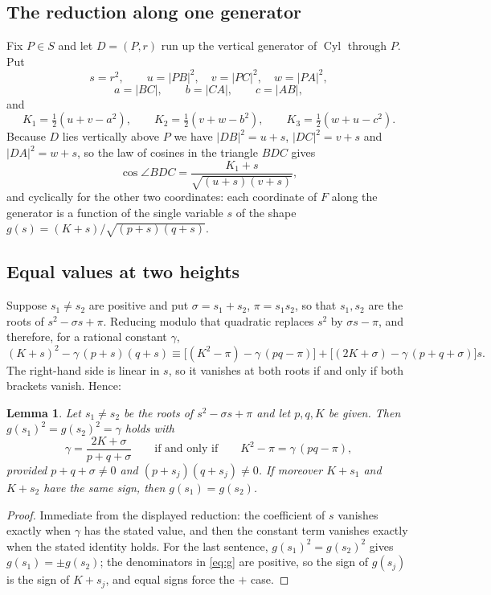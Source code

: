 \documentclass[11pt]{amsart}
\newtheorem{lemma}[theorem]{Lemma}
\theoremstyle{remark}
\DeclareMathOperator{\Cyl}{Cyl}
\begin{document}
\subsection*{The reduction along one generator}
Fix $P\in S$ and let $D=(P,r)$ run up the vertical generator of $\Cyl$ through $P$. Put
\[
 s=r^{2},\qquad u=|PB|^{2},\quad v=|PC|^{2},\quad w=|PA|^{2},
\]
\[
 a=|BC|,\qquad b=|CA|,\qquad c=|AB|,
\]
and
\[
 K_1=\tfrac12(u+v-a^{2}),\qquad K_2=\tfrac12(v+w-b^{2}),\qquad K_3=\tfrac12(w+u-c^{2}).
\]
Because $D$ lies vertically above $P$ we have $|DB|^{2}=u+s$, $|DC|^{2}=v+s$ and
$|DA|^{2}=w+s$, so the law of cosines in the triangle $BDC$ gives
\begin{equation}\label{eq:g}
 \cos\angle BDC=\frac{K_1+s}{\sqrt{(u+s)(v+s)}},
\end{equation}
and cyclically for the other two coordinates: each coordinate of $F$ along the generator is
a function of the single variable $s$ of the shape
$g(s)=(K+s)\bigl/\sqrt{(p+s)(q+s)}$.

\subsection*{Equal values at two heights}
Suppose $s_1\neq s_2$ are positive and put $\sigma=s_1+s_2$, $\pi=s_1s_2$, so that $s_1,s_2$
are the roots of $s^{2}-\sigma s+\pi$. Reducing modulo that quadratic replaces $s^{2}$ by
$\sigma s-\pi$, and therefore, for a rational constant $\gamma$,
\[
 (K+s)^{2}-\gamma\,(p+s)(q+s)
 \equiv
 \bigl[(K^{2}-\pi)-\gamma\,(pq-\pi)\bigr]
 +\bigl[(2K+\sigma)-\gamma\,(p+q+\sigma)\bigr]s .
\]
The right-hand side is linear in $s$, so it vanishes at both roots if and only if both
brackets vanish. Hence:

\begin{lemma}\label{lem:two}
Let $s_1\neq s_2$ be the roots of $s^{2}-\sigma s+\pi$ and let $p,q,K$ be given. Then
$g(s_1)^{2}=g(s_2)^{2}=\gamma$ holds with
\begin{equation}\label{eq:gamma}
 \gamma=\frac{2K+\sigma}{p+q+\sigma}
 \qquad\text{if and only if}\qquad
 K^{2}-\pi=\gamma\,(pq-\pi),
\end{equation}
provided $p+q+\sigma\neq0$ and $(p+s_j)(q+s_j)\neq0$. If moreover $K+s_1$ and $K+s_2$ have
the same sign, then $g(s_1)=g(s_2)$.
\end{lemma}

\begin{proof}
Immediate from the displayed reduction: the coefficient of $s$ vanishes exactly when
$\gamma$ has the stated value, and then the constant term vanishes exactly when the stated
identity holds. For the last sentence, $g(s_1)^{2}=g(s_2)^{2}$ gives
$g(s_1)=\pm g(s_2)$; the denominators in \eqref{eq:g} are positive, so the sign of $g(s_j)$
is the sign of $K+s_j$, and equal signs force the $+$ case.
\end{proof}
\end{document}
